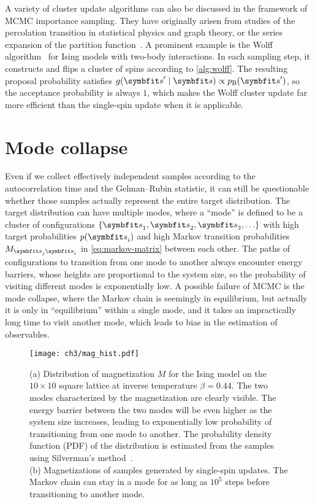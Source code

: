 A variety of cluster update algorithms can also be discussed in the framework of MCMC importance sampling. They have originally arisen from studies of the percolation transition in statistical physics and graph theory, or the series expansion of the partition function~\cite{fortuin1972random, leung1991percolation, evertz1993cluster}. A prominent example is the Wolff algorithm~\cite{wolff1989collective} for Ising models with two-body interactions. In each sampling step, it constructs and flips a cluster of spins according to \cref{alg:wolff}. The resulting proposal probability satisfies $g(\vs' \mid \vs) \propto p_\text{B}(\vs')$, so the acceptance probability is always $1$, which makes the Wolff cluster update far more efficient than the single-spin update when it is applicable.


\section{Mode collapse}
\label{sec:mode-collapse}

Even if we collect effectively independent samples according to the autocorrelation time and the Gelman--Rubin statistic, it can still be questionable whether those samples actually represent the entire target distribution. The target distribution can have multiple modes, where a ``mode'' is defined to be a cluster of configurations $\{\vs_1, \vs_2, \vs_3, \ldots\}$ with high target probabilities $p(\vs_i)$ and high Markov transition probabilities $M_{\vs_j \vs_i}$ in \cref{eq:markov-matrix} between each other. The paths of configurations to transition from one mode to another always encounter energy barriers, whose heights are proportional to the system size, so the probability of visiting different modes is exponentially low. A possible failure of MCMC is the mode collapse, where the Markov chain is seemingly in equilibrium, but actually it is only in ``equilibrium'' within a single mode, and it takes an impractically long time to visit another mode, which leads to bias in the estimation of observables.

\begin{figure}[htb]
\centering
\texttt{[image: ch3/mag\_hist.pdf]}
\caption[Distribution and sampling of magnetization for Ising model]{
(a) Distribution of magnetization $M$ for the Ising model on the $10 \times 10$ square lattice at inverse temperature $\beta = 0.44$.
The two modes characterized by the magnetization are clearly visible.
The energy barrier between the two modes will be even higher as the system size increases, leading to exponentially low probability of transitioning from one mode to another.
The probability density function (PDF) of the distribution is estimated from the samples using Silverman’s method~\cite{silverman1986density}. \\
(b) Magnetizations of samples generated by single-spin updates. The Markov chain can stay in a mode for as long as $10^5$ steps before transitioning to another mode.
}
\label{fig:mag-hist}
\end{figure}

